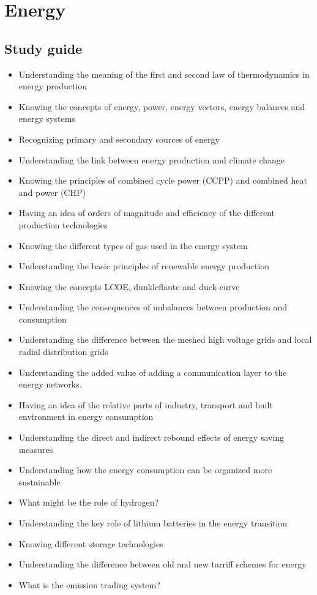 \documentclass[../summary.tex]{subfiles}
\begin{document}
	
	\section{Energy}
	
	\subsection{Study guide}
	\begin{itemize} 
		\setlength{\itemsep}{0pt}
		\item Understanding the meaning of the first and second law of thermodynamics in energy production
		\item Knowing the concepts of energy, power, energy vectors, energy balances and energy systems
		\item Recognizing primary and secondary sources of energy
		\item Understanding the link between energy production and climate change
		\item Knowing the principles of combined cycle power (CCPP) and combined heat and power (CHP)
		\item Having an idea of orders of magnitude and efficiency of the different production technologies
		\item Knowing the different types of gas used in the energy system
		\item Understanding the basic principles of renewable energy production
		\item Knowing the concepts LCOE, dunkleflaute and duck-curve
		\item Understanding the consequences of unbalances between production and consumption
		\item Understanding the difference between the meshed high voltage grids and local radial distribution grids
		\item Understanding the added value of adding a communication layer to the energy networks.
		\item Having an idea of the relative parts of industry, transport and built environment in energy consumption
		\item Understanding the direct and indirect rebound effects of energy saving measures
		\item Understanding how the energy consumption can be organized more sustainable
		\item What might be the role of hydrogen?
		\item Understanding the key role of lithium batteries in the energy transition
		\item Knowing different storage technologies
		\item Understanding the difference between old and new tarriff schemes for energy
		\item What is the emission trading system?
	\end{itemize}
	
\end{document}
